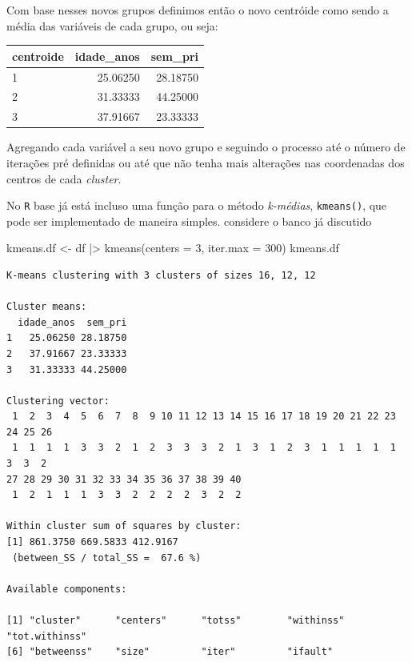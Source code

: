 \documentclass[
  letterpaper,
  DIV=11,
  numbers=noendperiod]{scrreprt}
\newenvironment{Shaded}{\begin{snugshade}}{\end{snugshade}}
\newcommand{\AttributeTok}[1]{\textcolor[rgb]{0.40,0.45,0.13}{#1}}
\newcommand{\DecValTok}[1]{\textcolor[rgb]{0.68,0.00,0.00}{#1}}
\newcommand{\FunctionTok}[1]{\textcolor[rgb]{0.28,0.35,0.67}{#1}}
\newcommand{\NormalTok}[1]{\textcolor[rgb]{0.00,0.23,0.31}{#1}}
\newcommand{\OtherTok}[1]{\textcolor[rgb]{0.00,0.23,0.31}{#1}}
\newcommand{\SpecialCharTok}[1]{\textcolor[rgb]{0.37,0.37,0.37}{#1}}
\begin{document}
Com base nesses novos grupos definimos então o novo centróide como sendo
a média das variáveis de cada grupo, ou seja:

\begin{longtable}[]{@{}lrr@{}}
\toprule()
centroide & idade\_anos & sem\_pri \\
\midrule()
\endhead
1 & 25.06250 & 28.18750 \\
2 & 31.33333 & 44.25000 \\
3 & 37.91667 & 23.33333 \\
\bottomrule()
\end{longtable}

Agregando cada variável a seu novo grupo e seguindo o processo até o
número de iterações pré definidas ou até que não tenha mais alterações
nas coordenadas dos centros de cada \emph{cluster}.

No \texttt{R} base já está incluso uma função para o método
\emph{k-médias}, \texttt{kmeans()}, que pode ser implementado de maneira
simples. considere o banco já discutido

\begin{Shaded}
\begin{Highlighting}[]
\NormalTok{kmeans.df }\OtherTok{\textless{}{-}}\NormalTok{ df }\SpecialCharTok{|\textgreater{}}
  \FunctionTok{kmeans}\NormalTok{(}\AttributeTok{centers =} \DecValTok{3}\NormalTok{, }\AttributeTok{iter.max =} \DecValTok{300}\NormalTok{)}
\NormalTok{kmeans.df}
\end{Highlighting}
\end{Shaded}

\begin{verbatim}
K-means clustering with 3 clusters of sizes 16, 12, 12

Cluster means:
  idade_anos  sem_pri
1   25.06250 28.18750
2   37.91667 23.33333
3   31.33333 44.25000

Clustering vector:
 1  2  3  4  5  6  7  8  9 10 11 12 13 14 15 16 17 18 19 20 21 22 23 24 25 26 
 1  1  1  1  3  3  2  1  2  3  3  3  2  1  3  1  2  3  1  1  1  1  1  3  3  2 
27 28 29 30 31 32 33 34 35 36 37 38 39 40 
 1  2  1  1  1  3  3  2  2  2  2  3  2  2 

Within cluster sum of squares by cluster:
[1] 861.3750 669.5833 412.9167
 (between_SS / total_SS =  67.6 %)

Available components:

[1] "cluster"      "centers"      "totss"        "withinss"     "tot.withinss"
[6] "betweenss"    "size"         "iter"         "ifault"      
\end{verbatim}
\end{document}
